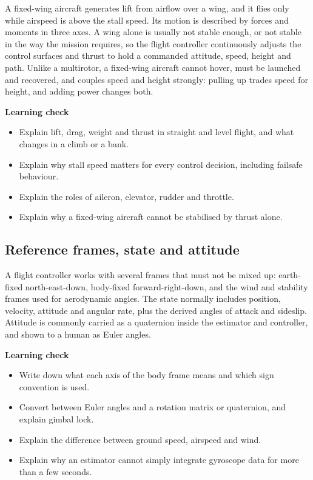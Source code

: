 \documentclass[11pt,a4paper]{article}
\begin{document}
A fixed-wing aircraft generates lift from airflow over a wing, and it flies
only while airspeed is above the stall speed. Its motion is described by forces
and moments in three axes. A wing alone is usually not stable enough, or not
stable in the way the mission requires, so the flight controller continuously
adjusts the control surfaces and thrust to hold a commanded attitude, speed,
height and path. Unlike a multirotor, a fixed-wing aircraft cannot hover, must
be launched and recovered, and couples speed and height strongly: pulling up
trades speed for height, and adding power changes both.

\textbf{Learning check}
\begin{itemize}
  \item Explain lift, drag, weight and thrust in straight and level flight, and what changes in a climb or a bank.
  \item Explain why stall speed matters for every control decision, including failsafe behaviour.
  \item Explain the roles of aileron, elevator, rudder and throttle.
  \item Explain why a fixed-wing aircraft cannot be stabilised by thrust alone.
\end{itemize}

\subsection{Reference frames, state and attitude}

A flight controller works with several frames that must not be mixed up:
earth-fixed north-east-down, body-fixed forward-right-down, and the wind and
stability frames used for aerodynamic angles. The state normally includes
position, velocity, attitude and angular rate, plus the derived angles of
attack and sideslip. Attitude is commonly carried as a quaternion inside the
estimator and controller, and shown to a human as Euler angles.

\textbf{Learning check}
\begin{itemize}
  \item Write down what each axis of the body frame means and which sign convention is used.
  \item Convert between Euler angles and a rotation matrix or quaternion, and explain gimbal lock.
  \item Explain the difference between ground speed, airspeed and wind.
  \item Explain why an estimator cannot simply integrate gyroscope data for more than a few seconds.
\end{itemize}
\end{document}
